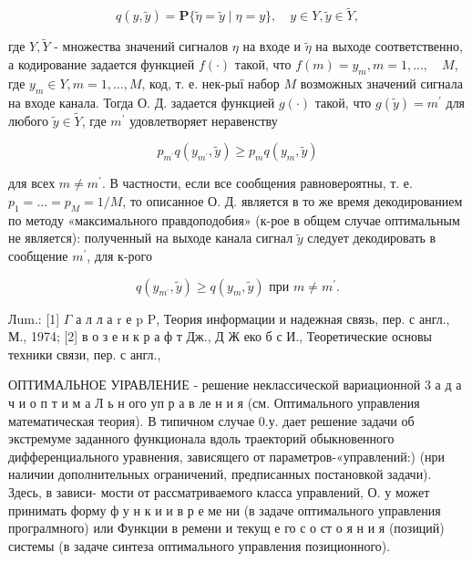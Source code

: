 \documentclass[10pt]{article}
\begin{document}
\[

q(y, \tilde{y})=\mathbf{P}\{\tilde{\eta}=\tilde{y} \mid \eta=y\}, \quad y \in Y, \tilde{y} \in \tilde{Y},

\]



где $Y, \tilde{Y}$ - множества значений сигналов $\eta$ на входе и $\tilde{\eta}$ на выходе соответственно, а кодирование задается функцией $f(\cdot)$ такой, что $f(m)=y_{m}, m=1, \ldots, \quad M$, где $y_{m} \in Y, m=1, \ldots, M$, код, т. е. нек-рыї набор $M$ возможных значений сигнала на входе канала. Тогда О. Д. задается функцией $g(\cdot)$ такой, что $g(\tilde{y})=m^{\prime}$ для любого $\tilde{y} \in \tilde{Y}$, где $m^{\prime}$ удовлетворяет неравенству



\[

p_{m^{\prime}} q\left(y_{m^{\prime}}, \tilde{y}\right) \geqslant p_{m} q\left(y_{m}, \tilde{y}\right)

\]



для всех $m \neq m^{\prime}$. В частности, если все сообщения равновероятны, т. е. $p_{1}=\ldots=p_{M}=1 / M$, то описанное О. Д. является в то же время декодированием по методу «максимального правдоподобия» (к-рое в общем случае оптимальным не является): полученный на выходе канала сигнал $\tilde{y}$ следует декодировать в сообщение $m^{\prime}$, для к-рого



\[

q\left(y_{m^{\prime}}, \tilde{y}\right) \geqslant q\left(y_{m}, \tilde{y}\right) \text { при } m \neq m^{\prime} .

\]



Лum.: [1] $\Gamma$ а л л а $\mathrm{r}$ е p $\mathrm{P}$, Теория информации и надежная связь, пер. с англ., М., 1974; [2] в о з е н к р а ф т Дж., Д Ж еко б с И., Теоретические основы техники связи, пер. с англ.,



ОПТИМАЛЬНОЕ УІРАВЛЕНИЕ - решение неклассической вариационной 3 а д а ч и о п т и м а Л ь н ого уп р а в ле н и я (см. Оптимального управления математическая теория). В типичном случае 0.у. дает решение задачи об экстремуме заданного функционала вдоль траекторий обыкновенного дифференциального уравнения, зависящего от параметров-«управлений:) (нри наличии дополнительных ограничений, предписанных постановкой задачи). Здесь, в зависи- мости от рассматриваемого класса управлений, О. у может принимать форму ф у н к и и в р е ме ни (в задаче оптимального управления програлмного) или Функции в ремени и текущ е го с о ст о я н и я (позиций) системы (в задаче синтеза оптимального управления позиционного).
\end{document}
